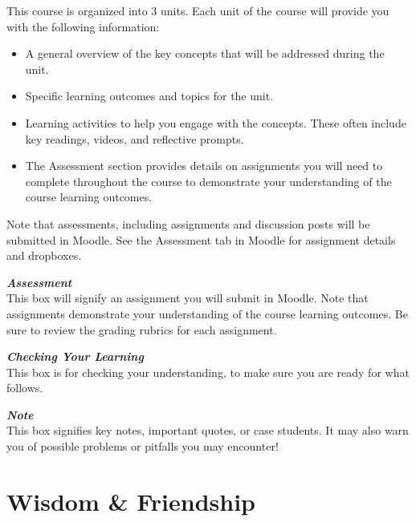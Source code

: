 \documentclass[
]{book}
\providecommand{\tightlist}{%
  \setlength{\itemsep}{0pt}\setlength{\parskip}{0pt}}
\begin{document}
This course is organized into 3 units. Each unit of the course will provide you with the following information:

\begin{itemize}
\tightlist
\item
  A general overview of the key concepts that will be addressed during the unit.\\
\item
  Specific learning outcomes and topics for the unit.\\
\item
  Learning activities to help you engage with the concepts. These often include key readings, videos, and reflective prompts.\\
\item
  The Assessment section provides details on assignments you will need to complete throughout the course to demonstrate your understanding of the course learning outcomes.
\end{itemize}

\begin{caution}
Note that assessments, including assignments and discussion posts will
be submitted in Moodle. See the Assessment tab in Moodle for assignment
details and dropboxes.
\end{caution}

\begin{assessment}
\textbf{\emph{Assessment}}\\
This box will signify an assignment you will submit in Moodle. Note that
assignments demonstrate your understanding of the course learning
outcomes. Be sure to review the grading rubrics for each assignment.
\end{assessment}

\begin{progress}
\textbf{\emph{Checking Your Learning}}\\
This box is for checking your understanding, to make sure you are ready
for what follows.
\end{progress}

\begin{feedback}
\textbf{\emph{Note}}\\
This box signifies key notes, important quotes, or case students. It may
also warn you of possible problems or pitfalls you may encounter!
\end{feedback}

\hypertarget{wisdom-friendship}{%
\chapter{Wisdom \& Friendship}\label{wisdom-friendship}}
\end{document}

